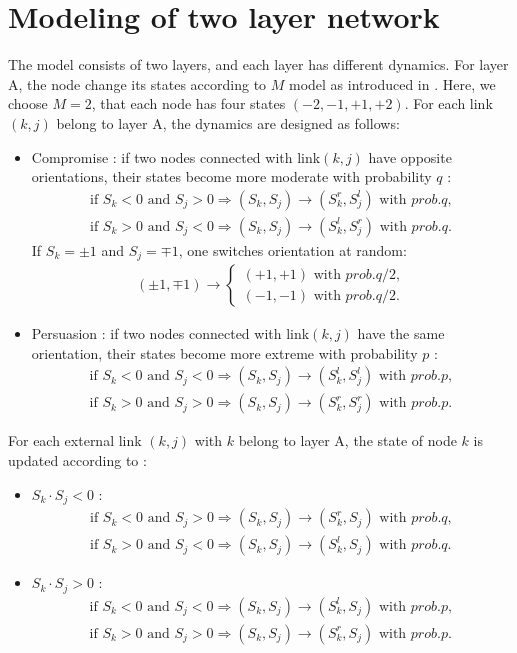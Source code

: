 \section{Modeling of two layer network}
\label{sec:modeling of two layer network}
The model consists of two layers, and each layer has different dynamics. For layer A, the node change its states according to $M$ model as introduced in \parencite{rocca2014}. Here, we choose $M=2$, that each node has four states $(-2, -1, +1, +2)$. For each link $(k, j)$ belong to layer A,  the dynamics are designed as follows:
\begin{itemize}
	\item Compromise : if two nodes connected with link$(k, j)$ have opposite orientations, their states become more moderate with probability $q$ :
	\begin{align}
	\mbox{if } S_k<0 \mbox{ and } S_j>0  \Rightarrow (S_k, S_j) \rightarrow (S_k^r, S_j^l) \mbox{ with } prob.q,\\
	\mbox{if } S_k>0 \mbox{ and } S_j<0  \Rightarrow (S_k, S_j) \rightarrow (S_k^l, S_j^r) \mbox{ with } prob.q.
	\end{align}
	If $S_k = \pm1$ and $S_j = \mp1$, one switches orientation at random:
	\begin{align}
	(\pm 1, \mp 1)\rightarrow \left\{\begin{matrix}
	(+1, +1) \mbox{ with } prob.q/2,
	\\(-1, -1)\mbox{ with } prob.q/2.
	\end{matrix}\right.
	\end{align}
		
	\item Persuasion : if two nodes connected with link$(k, j)$ have the same orientation, their states become more extreme with probability $p$ :
	\begin{align}
	\mbox{if } S_k<0 \mbox{ and } S_j<0  \Rightarrow (S_k, S_j) \rightarrow (S_k^l, S_j^l) \mbox{ with } prob.p,\\
	\mbox{if } S_k>0 \mbox{ and } S_j>0  \Rightarrow (S_k, S_j) \rightarrow (S_k^r, S_j^r) \mbox{ with } prob.p.
	\end{align}
\end{itemize}
For each external link $(k,j)$ with $k$ belong to layer A, the state of node $k$ is updated according to :
\begin{itemize}
	\item $S_k \cdot S_j < 0$ :
	\begin{align}
	\mbox{if } S_k<0 \mbox{ and } S_j>0  \Rightarrow (S_k, S_j) \rightarrow (S_k^r, S_j) \mbox{ with } prob.q,\\
	\mbox{if } S_k>0 \mbox{ and } S_j<0  \Rightarrow (S_k, S_j) \rightarrow (S_k^l, S_j) \mbox{ with } prob.q.
	\end{align}
	\item $S_k \cdot S_j > 0$ :
	\begin{align}
	\mbox{if } S_k<0 \mbox{ and } S_j<0  \Rightarrow (S_k, S_j) \rightarrow (S_k^l, S_j) \mbox{ with } prob.p,\\
	\mbox{if } S_k>0 \mbox{ and } S_j>0  \Rightarrow (S_k, S_j) \rightarrow (S_k^r, S_j) \mbox{ with } prob.p.
	\end{align}
\end{itemize}
